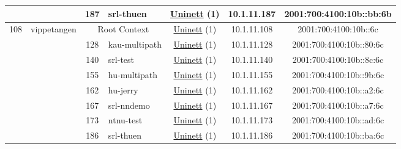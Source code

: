 \begin{small}
\begin{center}
\begin{longtable}{|c|c|c|c|c|c|c|c|}
  &  & \tiny{187} & \multicolumn{1}{|l|}{\tiny{srl-thuen}} & \multicolumn{2}{|c|}{\tiny{\href{https://www.uninett.no}{Uninett} (1)}} & \tiny{10.1.11.187} & \tiny{2001:700:4100:10b::bb:6b} \\ \hline
 \multirow{8}{*}{\tiny{108}} & \multicolumn{1}{|l|}{\multirow{8}{*}{\tiny{vippetangen}}} & \multicolumn{2}{|c|}{\tiny{Root Context}} & \multicolumn{2}{|c|}{\tiny{\href{https://www.uninett.no}{Uninett} (1)}} & \tiny{10.1.11.108} & \tiny{2001:700:4100:10b::6c} \\* \cline{3-3}\cline{4-4}\cline{5-5}\cline{6-6}\cline{7-7}\cline{8-8}
  &  & \tiny{128} & \multicolumn{1}{|l|}{\tiny{kau-multipath}} & \multicolumn{2}{|c|}{\tiny{\href{https://www.uninett.no}{Uninett} (1)}} & \tiny{10.1.11.128} & \tiny{2001:700:4100:10b::80:6c} \\* \cline{3-3}\cline{4-4}\cline{5-5}\cline{6-6}\cline{7-7}\cline{8-8}
  &  & \tiny{140} & \multicolumn{1}{|l|}{\tiny{srl-test}} & \multicolumn{2}{|c|}{\tiny{\href{https://www.uninett.no}{Uninett} (1)}} & \tiny{10.1.11.140} & \tiny{2001:700:4100:10b::8c:6c} \\* \cline{3-3}\cline{4-4}\cline{5-5}\cline{6-6}\cline{7-7}\cline{8-8}
  &  & \tiny{155} & \multicolumn{1}{|l|}{\tiny{hu-multipath}} & \multicolumn{2}{|c|}{\tiny{\href{https://www.uninett.no}{Uninett} (1)}} & \tiny{10.1.11.155} & \tiny{2001:700:4100:10b::9b:6c} \\* \cline{3-3}\cline{4-4}\cline{5-5}\cline{6-6}\cline{7-7}\cline{8-8}
  &  & \tiny{162} & \multicolumn{1}{|l|}{\tiny{hu-jerry}} & \multicolumn{2}{|c|}{\tiny{\href{https://www.uninett.no}{Uninett} (1)}} & \tiny{10.1.11.162} & \tiny{2001:700:4100:10b::a2:6c} \\* \cline{3-3}\cline{4-4}\cline{5-5}\cline{6-6}\cline{7-7}\cline{8-8}
  &  & \tiny{167} & \multicolumn{1}{|l|}{\tiny{srl-nndemo}} & \multicolumn{2}{|c|}{\tiny{\href{https://www.uninett.no}{Uninett} (1)}} & \tiny{10.1.11.167} & \tiny{2001:700:4100:10b::a7:6c} \\* \cline{3-3}\cline{4-4}\cline{5-5}\cline{6-6}\cline{7-7}\cline{8-8}
  &  & \tiny{173} & \multicolumn{1}{|l|}{\tiny{ntnu-test}} & \multicolumn{2}{|c|}{\tiny{\href{https://www.uninett.no}{Uninett} (1)}} & \tiny{10.1.11.173} & \tiny{2001:700:4100:10b::ad:6c} \\* \cline{3-3}\cline{4-4}\cline{5-5}\cline{6-6}\cline{7-7}\cline{8-8}
  &  & \tiny{186} & \multicolumn{1}{|l|}{\tiny{srl-thuen}} & \multicolumn{2}{|c|}{\tiny{\href{https://www.uninett.no}{Uninett} (1)}} & \tiny{10.1.11.186} & \tiny{2001:700:4100:10b::ba:6c} \\ \hline
\end{longtable}
\end{center}
\end{small}



